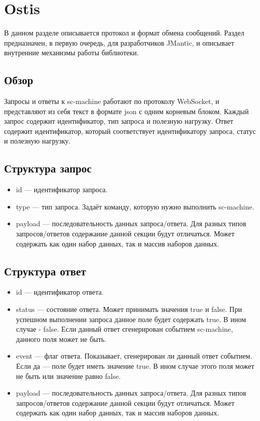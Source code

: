 \section{Ostis}
\label{sec:ostis}
В данном разделе описывается протокол и формат обмена сообщений. Раздел предназначен, в первую очередь, для разработчиков JMantic, и описывает внутренние механизмы работы библиотеки. 

\subsection{Обзор}
Запросы и ответы к sc-machine работают по протоколу WebSocket, и представляют из себя текст в формате json с одним корневым блоком. Каждый запрос содержит идентификатор, тип запроса и полезную нагрузку. Ответ содержит идентификатор, который соответствует идентификатору запроса, статус и полезную нагрузку. 

\subsection{Структура запрос}
\begin{itemize}
\item id --- идентификатор запроса. 
\item type --- тип запроса. Задаёт команду, которую нужно выполнить sc-machine. 
\item payload --- последовательность данных запроса/ответа. Для разных типов запросов/ответов содержание данной секции будут отличаться. Может содержать как один набор данных, так и массив наборов данных. 
\end{itemize}

\subsection{Структура ответ}
\begin{itemize}
\item id --- идентификатор ответа.
\item status --- состояние ответа. Может принимать значения true и false. При успешном выполнении запроса данное поле будет содержать true. В ином случае -  false. Если данный ответ сгенерирован событием sc-machine, данного поля может не быть.
\item event --- флаг ответа. Показывает, сгенерирован ли данный ответ событием. Если да --- поле будет иметь значение true. В ином случае этого поля может не быть или значение равно false.
\item payload --- последовательность данных запроса/ответа. Для разных типов запросов/ответов содержание данной секции будут отличаться. Может содержать как один набор данных, так и массив наборов данных. 
\end{itemize}

